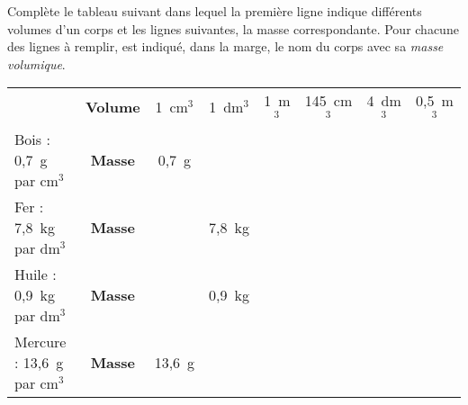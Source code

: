 Complète le tableau suivant dans lequel la première ligne indique différents volumes d'un corps et les lignes suivantes, la masse correspondante. Pour chacune des lignes à remplir, est indiqué, dans la marge, le nom du corps avec sa {\em masse volumique}.
\renewcommand{\arraystretch}{1.5}
\begin{center}
\begin{tabular}{l|c|c|c|c|c|c|c|}
\cline{2-8}
&{\bf Volume}&1~cm$^3$&1~dm$^3$&1~m$^3$&145~cm$^3$&4~dm$^3$&0,5~m$^3$\\
\cline{2-8}
Bois : 0,7~g par cm$^3$&{\bf Masse}&0,7~g&&&&&\\
\cline{2-8}
Fer : 7,8~kg par dm$^3$&{\bf Masse}&&7,8~kg&&&&\\
\cline{2-8}
Huile : 0,9~kg par dm$^3$&{\bf Masse}&&0,9~kg&&&&\\
\cline{2-8}
Mercure : 13,6~g par cm$^3$&{\bf Masse}&13,6~g&&&&&\\
\cline{2-8}
\end{tabular}
\end{center}
\renewcommand{\arraystretch}{1}
